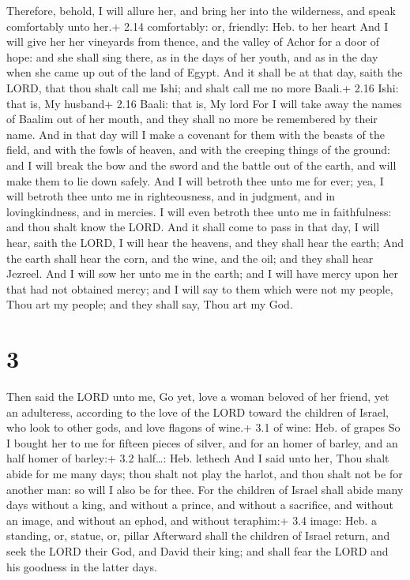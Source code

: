  Therefore, behold, I will allure her, and bring her into
the wilderness, and speak comfortably unto her.+ 2.14 comfortably: or,
friendly: Heb. to her heart  And I will give her her
vineyards from thence, and the valley of Achor for a door of hope: and
she shall sing there, as in the days of her youth, and as in the day
when she came up out of the land of Egypt.  And it shall be
at that day, saith the LORD, that thou shalt call me Ishi; and shalt
call me no more Baali.+ 2.16 Ishi: that is, My husband+ 2.16 Baali: that
is, My lord  For I will take away the names of Baalim out
of her mouth, and they shall no more be remembered by their name.
 And in that day will I make a covenant for them with the
beasts of the field, and with the fowls of heaven, and with the creeping
things of the ground: and I will break the bow and the sword and the
battle out of the earth, and will make them to lie down safely.
 And I will betroth thee unto me for ever; yea, I will
betroth thee unto me in righteousness, and in judgment, and in
lovingkindness, and in mercies.  I will even betroth thee
unto me in faithfulness: and thou shalt know the LORD.  And
it shall come to pass in that day, I will hear, saith the LORD, I will
hear the heavens, and they shall hear the earth;  And the
earth shall hear the corn, and the wine, and the oil; and they shall
hear Jezreel.  And I will sow her unto me in the earth; and
I will have mercy upon her that had not obtained mercy; and I will say
to them which were not my people, Thou art my people; and they shall
say, Thou art my God.

\hypertarget{section-2}{%
\section{3}\label{section-2}}

 Then said the LORD unto me, Go yet, love a woman beloved of
her friend, yet an adulteress, according to the love of the LORD toward
the children of Israel, who look to other gods, and love flagons of
wine.+ 3.1 of wine: Heb. of grapes  So I bought her to me
for fifteen pieces of silver, and for an homer of barley, and an half
homer of barley:+ 3.2 half\ldots: Heb. lethech  And I said
unto her, Thou shalt abide for me many days; thou shalt not play the
harlot, and thou shalt not be for another man: so will I also be for
thee.  For the children of Israel shall abide many days
without a king, and without a prince, and without a sacrifice, and
without an image, and without an ephod, and without teraphim:+ 3.4
image: Heb. a standing, or, statue, or, pillar  Afterward
shall the children of Israel return, and seek the LORD their God, and
David their king; and shall fear the LORD and his goodness in the latter
days.

